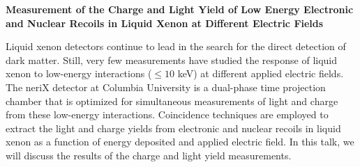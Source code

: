 \documentclass[12pt,a4paper]{article}
\begin{document}
\begin{center}
\textbf{Measurement of the Charge and Light Yield of Low Energy Electronic and Nuclear Recoils in Liquid Xenon at Different Electric Fields}

Liquid xenon detectors continue to lead in the search for the direct detection of dark matter.  Still, very few measurements have studied the response of liquid xenon to low-energy interactions ($\leq 10$ keV) at different applied electric fields.  The neriX detector at Columbia University is a dual-phase time projection chamber that is optimized for simultaneous measurements of light and charge from these low-energy interactions.  Coincidence techniques are employed to extract the light and charge yields from electronic and nuclear recoils in liquid xenon as a function of energy deposited and applied electric field.  In this talk, we will discuss the results of the charge and light yield measurements.
\end{center}
\end{document}

